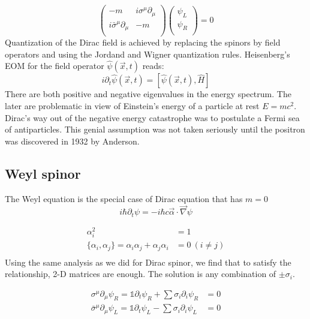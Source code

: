 \[
    \begin{pmatrix}
	-m  & i\sigma^\mu\partial_\mu	\\
	i\bar{\sigma}^\mu\partial_\mu	& -m	\\
    \end{pmatrix}
    \begin{pmatrix}
	\psi_L	\\
	\psi_R	\\
    \end{pmatrix} = 0
\]
Quantization of the Dirac field is achieved by replacing the spinors by
field operators and using the Jordand and Wigner quantization rules.
Heisenberg's EOM for the field operator $\hat{\psi}(\vec{x}, t)$
reads:
$$ i\partial_{t}\hat{\psi}(\vec{x}, t) = [
    \hat{\psi}(\vec{x}, t), \hat{H}]$$
There are both positive and negative eigenvalues in the energy spectrum. The
later are problematic in view of Einstein’s energy of a particle at rest 
$ E = mc^2 $. Dirac’s way out of the negative energy catastrophe was to 
postulate a Fermi sea of antiparticles. This genial assumption was not 
taken seriously until the positron was discovered in 1932 by Anderson.

\subsection{Weyl spinor}
The Weyl equation is the special case of Dirac equation that has $m = 0$
\begin{equation}
    i\hbar\partial_t\psi = -i\hbar c\vec{\alpha}\cdot \vec{\nabla}\psi
    \label{eq:Weyl.0}
\end{equation}

\begin{equation}
    \begin{aligned}
	\alpha_i^2 &= 1   \\
	\{\alpha_i, \alpha_j\} = \alpha_i\alpha_j + \alpha_j \alpha_i &= 0 \ (i \ne j)\\
    \end{aligned}
\end{equation}
Using the same analysis as we did for Dirac spinor, we find that to satisfy 
the relationship, 2-D matrices are enough. The solution is any combination of
$\pm \sigma_i$.

\begin{equation}
    \begin{aligned}
	\sigma^\mu\partial_\mu\psi_R=\mathds{1}\partial_t\psi_R + \sum \sigma_i\partial_i \psi_R &= 0	\\
	\bar{\sigma}^\mu\partial_\mu\psi_L=\mathds{1}\partial_t\psi_L - \sum \sigma_i\partial_i \psi_L &= 0
    \end{aligned}
    \label{eq:Weyl}
\end{equation}

